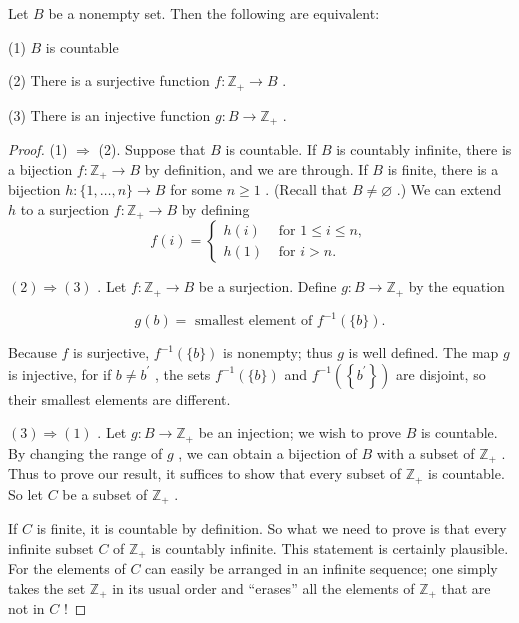 \begin{theorem} Let \(B\) be a nonempty set. Then the following are equivalent:

(1) \(B\) is countable

(2) There is a surjective function \(f : {\mathbb{Z}}_{ + } \rightarrow  B\) .

(3) There is an injective function \(g : B \rightarrow  {\mathbb{Z}}_{ + }\) .

\begin{proof}(1) \(\Rightarrow\) (2). Suppose that \(B\) is countable. If \(B\) is countably infinite, there is a bijection \(f : {\mathbb{Z}}_{ + } \rightarrow  B\) by definition, and we are through. If \(B\) is finite, there is a bijection \(h : \{ 1,\ldots ,n\}  \rightarrow  B\) for some \(n \geq  1\) . (Recall that \(B \neq  \varnothing\) .) We can extend \(h\) to a surjection \(f : {\mathbb{Z}}_{ + } \rightarrow  B\) by defining
\[
f\left( i\right)  = \left\{  \begin{array}{ll} h\left( i\right) & \text{ for }1 \leq  i \leq  n, \\  h\left( 1\right) & \text{ for }i > n. \end{array}\right.
\]

\(\left( 2\right)  \Rightarrow  \left( 3\right)\) . Let \(f : {\mathbb{Z}}_{ + } \rightarrow  B\) be a surjection. Define \(g : B \rightarrow  {\mathbb{Z}}_{ + }\) by the equation

\[
g\left( b\right)  = \text{ smallest element of }{f}^{-1}\left( {\{ b\} }\right) .
\]

Because \(f\) is surjective, \({f}^{-1}\left( {\{ b\} }\right)\) is nonempty; thus \(g\) is well defined. The map \(g\) is injective, for if \(b \neq  {b}^{\prime }\) , the sets \({f}^{-1}\left( {\{ b\} }\right)\) and \({f}^{-1}\left( \left\{  {b}^{\prime }\right\}  \right)\) are disjoint, so their smallest elements are different.

\(\left( 3\right)  \Rightarrow  \left( 1\right)\) . Let \(g : B \rightarrow  {\mathbb{Z}}_{ + }\) be an injection; we wish to prove \(B\) is countable. By changing the range of \(g\) , we can obtain a bijection of \(B\) with a subset of \({\mathbb{Z}}_{ + }\) . Thus to prove our result, it suffices to show that every subset of \({\mathbb{Z}}_{ + }\) is countable. So let \(C\) be a subset of \({\mathbb{Z}}_{ + }\) .

If \(C\) is finite, it is countable by definition. So what we need to prove is that every infinite subset \(C\) of \({\mathbb{Z}}_{ + }\) is countably infinite. This statement is certainly plausible. For the elements of \(C\) can easily be arranged in an infinite sequence; one simply takes the set \({\mathbb{Z}}_{ + }\) in its usual order and ``erases'' all the elements of \({\mathbb{Z}}_{ + }\) that are not in \(C\) !


\end{proof}
\end{theorem}
